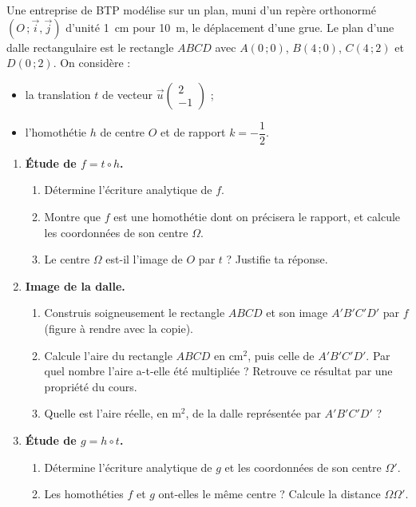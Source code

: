 \documentclass[11pt]{article}
\begin{document}
\begin{exercice}
Une entreprise de BTP modélise sur un plan, muni d'un repère orthonormé $(O\,;\vec{i},\vec{j})$ d'unité \SI{1}{cm} pour \SI{10}{m}, le déplacement d'une grue. Le plan d'une dalle rectangulaire est le rectangle $ABCD$ avec $A(0\,;0)$, $B(4\,;0)$, $C(4\,;2)$ et $D(0\,;2)$. On considère :
\begin{itemize}
\item la translation $t$ de vecteur $\vec{u}\begin{pmatrix} 2 \\ -1 \end{pmatrix}$ ;
\item l'homothétie $h$ de centre $O$ et de rapport $k = -\dfrac{1}{2}$.
\end{itemize}
\begin{enumerate}
\item \textbf{Étude de $f = t \circ h$.}
\begin{enumerate}
\item Détermine l'écriture analytique de $f$.
\item Montre que $f$ est une homothétie dont on précisera le rapport, et calcule les coordonnées de son centre $\Omega$.
\item Le centre $\Omega$ est-il l'image de $O$ par $t$ ? Justifie ta réponse.
\end{enumerate}
\item \textbf{Image de la dalle.}
\begin{enumerate}
\item Construis soigneusement le rectangle $ABCD$ et son image $A'B'C'D'$ par $f$ (figure à rendre avec la copie).
\item Calcule l'aire du rectangle $ABCD$ en $\mathrm{cm}^2$, puis celle de $A'B'C'D'$. Par quel nombre l'aire a-t-elle été multipliée ? Retrouve ce résultat par une propriété du cours.
\item Quelle est l'aire réelle, en $\mathrm{m}^2$, de la dalle représentée par $A'B'C'D'$ ?
\end{enumerate}
\item \textbf{Étude de $g = h \circ t$.}
\begin{enumerate}
\item Détermine l'écriture analytique de $g$ et les coordonnées de son centre $\Omega'$.
\item Les homothéties $f$ et $g$ ont-elles le même centre ? Calcule la distance $\Omega\Omega'$.
\end{enumerate}
\end{enumerate}
\end{exercice}
\end{document}

